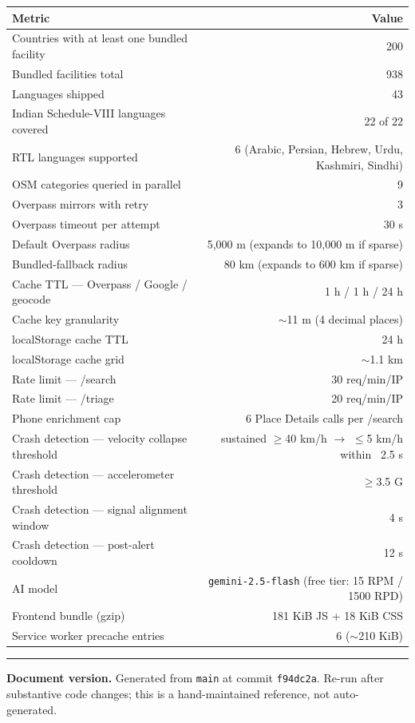 \documentclass[11pt, a4paper]{article}
\newcommand{\code}[1]{\texttt{\small#1}}
\begin{document}
\begin{tabularx}{\textwidth}{X r}
\toprule
\textbf{Metric} & \textbf{Value} \\
\midrule
Countries with at least one bundled facility & 200 \\
Bundled facilities total & 938 \\
Languages shipped & 43 \\
Indian Schedule-VIII languages covered & 22 of 22 \\
RTL languages supported & 6 (Arabic, Persian, Hebrew, Urdu, Kashmiri, Sindhi) \\
OSM categories queried in parallel & 9 \\
Overpass mirrors with retry & 3 \\
Overpass timeout per attempt & 30 s \\
Default Overpass radius & 5{,}000 m (expands to 10{,}000 m if sparse) \\
Bundled-fallback radius & 80 km (expands to 600 km if sparse) \\
Cache TTL --- Overpass / Google / geocode & 1 h / 1 h / 24 h \\
Cache key granularity & $\sim$11 m (4 decimal places) \\
localStorage cache TTL & 24 h \\
localStorage cache grid & $\sim$1.1 km \\
Rate limit --- /search & 30 req/min/IP \\
Rate limit --- /triage & 20 req/min/IP \\
Phone enrichment cap & 6 Place Details calls per /search \\
Crash detection --- velocity collapse threshold & sustained $\ge$40 km/h $\rightarrow$ $\le$5 km/h within ~2.5 s \\
Crash detection --- accelerometer threshold & $\ge$3.5 G \\
Crash detection --- signal alignment window & 4 s \\
Crash detection --- post-alert cooldown & 12 s \\
AI model & \code{gemini-2.5-flash} (free tier: 15 RPM / 1500 RPD) \\
Frontend bundle (gzip) & 181 KiB JS + 18 KiB CSS \\
Service worker precache entries & 6 ($\sim$210 KiB) \\
\bottomrule
\end{tabularx}

\vspace{0.8cm}
\hrule
\vspace{0.4cm}
\small
\noindent
\textbf{Document version.} Generated from \code{main} at commit \texttt{f94dc2a}. Re-run after substantive code changes; this is a hand-maintained reference, not auto-generated.
\end{document}

